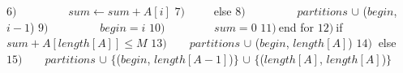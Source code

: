 \documentclass[11pt]{article}
\begin{document}
\begin{flushleft}
	$6)\ \qquad\qquad$ $sum \leftarrow sum + A[i]$ \newline
	$7)\ \qquad$ else \newline
	$8)\ \qquad\qquad$ $partitions$ $\cup$ ($begin$, $i - 1$) \newline
	$9)\ \qquad\qquad$ $begin = i$ \newline
	$10) \qquad\qquad$ $sum = 0$ \newline
	$11)\ $end for \newline
	$12)\ $if $sum + A[length[A]] \leq M$ \newline
	$13)\qquad partitions$ $\cup$ ($begin$, $length[A]$)  \newline
	$14)\ $ else \newline
	$15)\qquad partitions$ $\cup$ $\lbrace$($begin$, $length[A - 1]$)$\rbrace$ $\cup$ $\lbrace$($length[A]$, $length[A]$)$\rbrace$\newline
	\end{flushleft}
\end{document}
